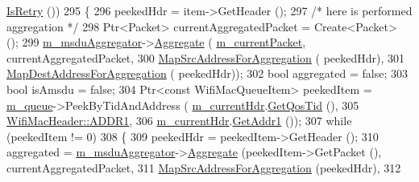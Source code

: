 \begin{DoxyCode}
      \hyperlink{classns3_1_1WifiMacHeader_af8da93935be1b55289003fbb29f81d64}{IsRetry} ())
295             \{
296               peekedHdr = item->GetHeader ();
297               \textcolor{comment}{/* here is performed aggregation */}
298               Ptr<Packet> currentAggregatedPacket = Create<Packet> ();
299               \hyperlink{classns3_1_1EdcaTxopN_ab4ec029e40b068965e1c7e80b1750027}{m\_msduAggregator}->\hyperlink{classns3_1_1MsduAggregator_a7eb8e17d5852eeb1d1499795a4696f19}{Aggregate} (
      \hyperlink{classns3_1_1DcaTxop_a3c454c21337aac0944f86caad8b7a719}{m\_currentPacket}, currentAggregatedPacket,
300                                            \hyperlink{classns3_1_1EdcaTxopN_adddb74b3fd751b59f79e2405ecbd513c}{MapSrcAddressForAggregation} (
      peekedHdr),
301                                            \hyperlink{classns3_1_1EdcaTxopN_a766951341864967a984075e33b0606c4}{MapDestAddressForAggregation} (
      peekedHdr));
302               \textcolor{keywordtype}{bool} aggregated = \textcolor{keyword}{false};
303               \textcolor{keywordtype}{bool} isAmsdu = \textcolor{keyword}{false};
304               Ptr<const WifiMacQueueItem> peekedItem = \hyperlink{classns3_1_1DcaTxop_a7f42500857237f6f18aee436ef22ef62}{m\_queue}->PeekByTidAndAddress (
      \hyperlink{classns3_1_1DcaTxop_ae965eb2f4d504e00526e751cd1dab3a6}{m\_currentHdr}.\hyperlink{classns3_1_1WifiMacHeader_a2b3faf14ac0d16a29729a2336afd7662}{GetQosTid} (),
305                                                                                      
      \hyperlink{classns3_1_1WifiMacHeader_a17406db48973a8e8fb6d961dd35154fea8ff9765c77ab96f3bbc7385ece3d00bf}{WifiMacHeader::ADDR1},
306                                                                                      
      \hyperlink{classns3_1_1DcaTxop_ae965eb2f4d504e00526e751cd1dab3a6}{m\_currentHdr}.\hyperlink{classns3_1_1WifiMacHeader_a5ddcfd82e7c5a17ffea5be9246544530}{GetAddr1} ());
307               \textcolor{keywordflow}{while} (peekedItem != 0)
308                 \{
309                   peekedHdr = peekedItem->GetHeader ();
310                   aggregated = \hyperlink{classns3_1_1EdcaTxopN_ab4ec029e40b068965e1c7e80b1750027}{m\_msduAggregator}->\hyperlink{classns3_1_1MsduAggregator_a7eb8e17d5852eeb1d1499795a4696f19}{Aggregate} (peekedItem->GetPacket 
      (), currentAggregatedPacket,
311                                                             
      \hyperlink{classns3_1_1EdcaTxopN_adddb74b3fd751b59f79e2405ecbd513c}{MapSrcAddressForAggregation} (peekedHdr),
312                                                             

\end{DoxyCode}
